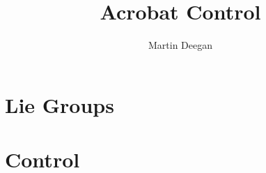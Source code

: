 \documentclass[11pt]{article}
\title{Acrobat Control}
\author{Martin Deegan}
\begin{document}
 
\maketitle
\tableofcontents

\section{Lie Groups}

\section{Control}
\end{document}
